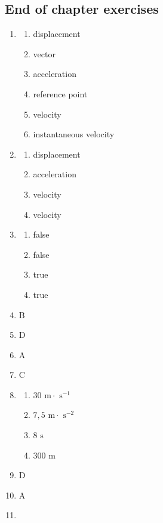 \subsection{End of chapter exercises}
\begin{multicols}{3}
 \begin{enumerate}[noitemsep, label=\textbf{(\arabic*)} ]
  \item 
\begin{enumerate}[noitemsep, label=\textbf{(\alph*)} ]
 \item displacement
\item vector
\item acceleration
\item reference point
\item velocity
\item instantaneous velocity
\end{enumerate}
\item 
\begin{enumerate}[noitemsep, label=\textbf{(\alph*)} ]
 \item displacement
\item acceleration
\item velocity
\item velocity
\end{enumerate}
\item 
\begin{enumerate}[noitemsep, label=\textbf{(\alph*)} ]
 \item false
\item false
\item true
\item true
\end{enumerate}
\item B 
\item D
\item A
\item C
\item 
\begin{enumerate}[noitemsep, label=\textbf{(\alph*)} ]
 \item $30 \text{ m} \cdot \text{ s}^{-1}$
\item $7,5 \text{ m} \cdot \text{ s}^{-2}$
\item $8 \text{ s}$
\item $300 \text{ m}$
\end{enumerate}
\item D
\item A
\item 
\begin{enumerate}[noitemsep, label=\textbf{(\alph*)} ]

\end{enumerate}
\end{enumerate}
\end{multicols}

